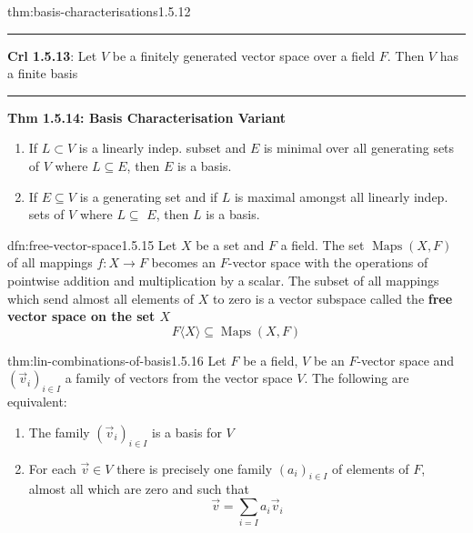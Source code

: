 \documentclass[landscape, 8pt]{extarticle}
\DeclareMathOperator{\Maps}{Maps}
\begin{document}
\begin{multicols}{3}
\begin{thm}{thm:basis-characterisations}{1.5.12}
    \vspace{-10pt}
    \noindent\rule{\textwidth}{0.2pt}
    \textbf{Crl 1.5.13}: Let $V$ be a finitely generated vector space over a field $F$. Then $V$ has a finite basis

    \vspace{-5pt}
    \noindent\rule{\textwidth}{0.2pt}
    \textbf{Thm 1.5.14: Basis Characterisation Variant}
    \vspace{-5pt}
    \begin{enumerate}
        \setlength\itemsep{0em}
        \item If $L \subset V$ is a linearly indep. subset and $E$ is minimal over all generating sets of $V$ where $L \subseteq E$, then $E$ is a basis.
        \item If $E \subseteq V$ is a generating set and if $L$ is maximal amongst all linearly indep. sets of $V$ where $L \subseteq$ $E$, then $L$ is a basis.
    \end{enumerate}
\end{thm}

\vspace{-5pt}
\begin{dfn}{dfn:free-vector-space}{1.5.15}
    Let $X$ be a set and $F$ a field. The set $\Maps(X, F)$ of all mappings $f: X \to F $ becomes an $F$-vector space with the operations of pointwise addition and multiplication by a scalar. The subset of all mappings which send almost all elements of $X$ to zero is a vector subspace called the \textbf{free vector space on the set $X$}
    \[F\langle X \rangle \subseteq \Maps(X, F)\]
\end{dfn}

\vspace{-5pt}
\begin{thm}{thm:lin-combinations-of-basis}{1.5.16}
    Let $F$ be a field, $V$ be an $F$-vector space and $(\vec{v}_{i})_{i\in I}$ a family of vectors from the vector space $V$. The following are equivalent:
    \begin{enumerate}
        \setlength\itemsep{0em}
        \item The family $(\vec{v}_{i})_{i\in I}$ is a basis for $V$
        \item For each $\vec{v}\in V$ there is precisely one family $(a_{i})_{i\in I}$ of elements of $F$, almost all which are zero and such that
            \[\vec{v} = \sum_{i = I} a_{i}\vec{v}_{i}\]
    \end{enumerate}
\end{thm}



\end{multicols}
\end{document}
